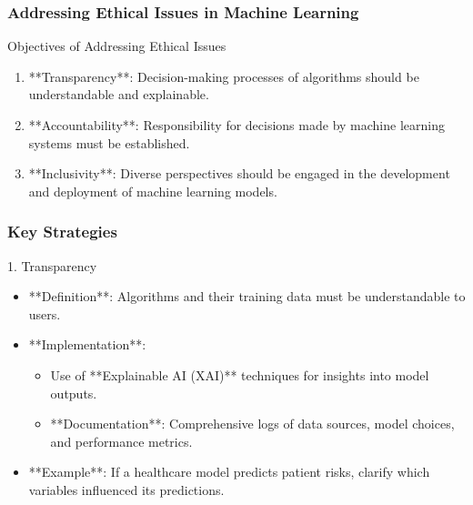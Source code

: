 \documentclass[aspectratio=169]{beamer}
\begin{document}
\begin{frame}[fragile]
    \frametitle{Addressing Ethical Issues in Machine Learning}
    \begin{block}{Objectives of Addressing Ethical Issues}
        \begin{enumerate}
            \item **Transparency**: Decision-making processes of algorithms should be understandable and explainable.
            \item **Accountability**: Responsibility for decisions made by machine learning systems must be established.
            \item **Inclusivity**: Diverse perspectives should be engaged in the development and deployment of machine learning models.
        \end{enumerate}
    \end{block}
\end{frame}

\begin{frame}[fragile]
    \frametitle{Key Strategies}
    \begin{block}{1. Transparency}
        \begin{itemize}
            \item **Definition**: Algorithms and their training data must be understandable to users.
            \item **Implementation**:
                \begin{itemize}
                    \item Use of **Explainable AI (XAI)** techniques for insights into model outputs.
                    \item **Documentation**: Comprehensive logs of data sources, model choices, and performance metrics.
                \end{itemize}
            \item **Example**: If a healthcare model predicts patient risks, clarify which variables influenced its predictions.
        \end{itemize}
    \end{block}
\end{frame}
\end{document}
